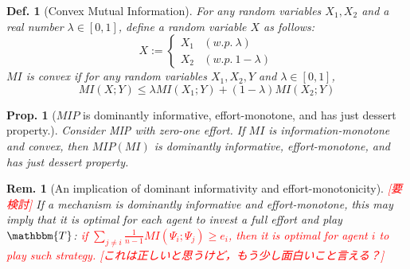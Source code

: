 \documentclass[11pt,a4paper,dvipdfmx]{article}
\theoremstyle{plain}
\newtheorem{prop}{Prop.}[section]
\newtheorem{df}{Def.}[section]
\newtheorem{rem}{Rem.}[section]
\newcommand{\1}{\mathbbm{1}}
\newcommand{\ocomment}[1]{{\textcolor{red}{#1}}}
\begin{document}
\begin{df}[Convex Mutual Information]
	For any random variables $X_1,X_2$ and a real number $\lambda \in [0,1]$, define a random variable $X$ as follows:
	$$X := 
	\begin{cases}
		X_1 & (w.p. \ \lambda) \\
		X_2 & (w.p. \ 1 - \lambda)
	\end{cases}
	$$
	$MI$ is convex if for any random variables $X_1,X_2,Y$ and $\lambda \in [0,1]$,
	$$
	MI(X; Y) \leq \lambda MI(X_1; Y) + (1 - \lambda)MI(X_2; Y)
	$$
\end{df}

\begin{screen}
\begin{prop}[$MIP$ is dominantly informative, effort-monotone, and has just dessert property.]
\label{prop_mip_effort}
	Consider MIP with zero-one effort. If $MI$ is information-monotone and convex, then $MIP(MI)$ is dominantly informative, effort-monotone, and has just dessert property.
\end{prop}
\end{screen}

\begin{rem}[An implication of dominant informativity and effort-monotonicity]
\ocomment{[要検討]}
	If a mechanism is dominantly informative and effort-monotone, this may imply that it is optimal for each agent to invest a full effort and play $\mathbbm{T}$:
	\ocomment{if $\sum_{j \neq i} \frac{1}{n-1} MI(\Psi_i; \Psi_j) \geq e_i$, then it is optimal for agent $i$ to play such strategy. [これは正しいと思うけど，もう少し面白いこと言える？]}
\end{rem}
\end{document}
